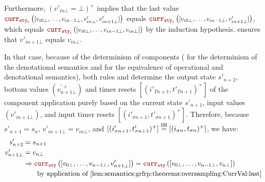 \begin{skippableproof}
\begin{itemize}
              Furthermore, $\left(v'_{in\bot} = \bot\right)^+$ implies that the last value
              $\CurrVal{sty_i}{\mathfoot{[v_{i0\bot}, \dots, v_{in-1\bot}, v'_{in\bot}, v'_{in+1\bot}]}}$ equals
              $\CurrVal{sty_i}{\mathfoot{[v_{i0\bot}, \dots, v_{in-1\bot}, v'_{in+1\bot}]}}$, which equals
              $\CurrVal{sty_i}{\mathfoot{[v_{i0\bot}, \dots, v_{in-1\bot}, v_{in\bot}]}}$ by the induction hypothesis.
               ensures that $v'_{in+1\bot}$
              equals $v_{in\bot}$.

              In that case, because of the determinism of components
              (\cf {} for the determinism of the
              denotational semantics and  for the
              equivalence of operational and denotational semantics), both rules  and  determine the output state $s'_{n+2}$, bottom values
              $(v_{n+1\bot}^{\prime+})$ and timer resets $[(i'_{Tn+1}, t'_{Tn+1})^+]$ of the
              component application purely based on the current state $s'_{n+1}$, input values
              $(v'_{in+1\bot})$, and input timer resets $[(i'_{\sigma n+1}, t'_{\sigma n+1})^+]$.
              Therefore, because $s'_{n+1} = s_n$, $v'_{in+1\bot} = v_{in\bot}$, and
              $[(i'_{\sigma n+1}, t'_{\sigma n+1})^+] \overset{\mathrm{IH}}{=} [(i_{\sigma n}, t_{\sigma n})^+]$,
              we have:
              \begin{align*}
                  s'_{n+2}     & = s_{n+1}                                                                                                                                        \\
                  v'_{n+1\bot} & = v_{n\bot}                                                                                                                                      \\
                               & \Rightarrow \CurrVal{sty}{[v_{0\bot}, \dots, v_{n-1\bot}, v'_{n+1\bot}]} = \CurrVal{sty}{[v_{0\bot}, \dots, v_{n-1\bot}, v_{n\bot}]}             \\
                               & \qquad \text{by application of \Cref{lem:semantics:grfrp:theorems:oversampling:CurrVal:last}}                                                    \\

\end{align*}
\end{itemize}
\end{skippableproof}
